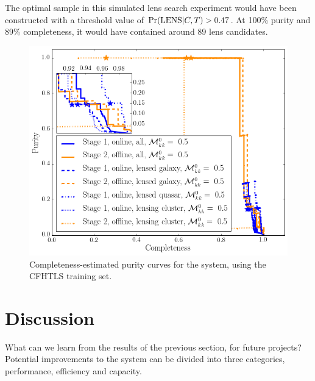 \documentclass[useAMS,usenatbib,a4paper]{mn2e}
\begin{document}
The optimal sample in this simulated lens search experiment would have been
constructed with a threshold value of ${\rm Pr}({\rm LENS}|C,T) > 0.47$. At 100\% purity
and 89\% completeness, it would have contained around 89 lens candidates.

\begin{figure}
\centering\includegraphics[width=\linewidth]{sw-system-figs/completeness_purity.png}
\caption{Completeness-estimated purity curves for the \sw system, using
the CFHTLS training set.}
\label{fig:results:sample:CP}
\end{figure}



\section{Discussion}
\label{sec:discuss}

What can we learn from the results of the previous section, for future
projects? Potential improvements to the \sw system can be divided into three
categories, performance, efficiency and capacity.

\end{document}
